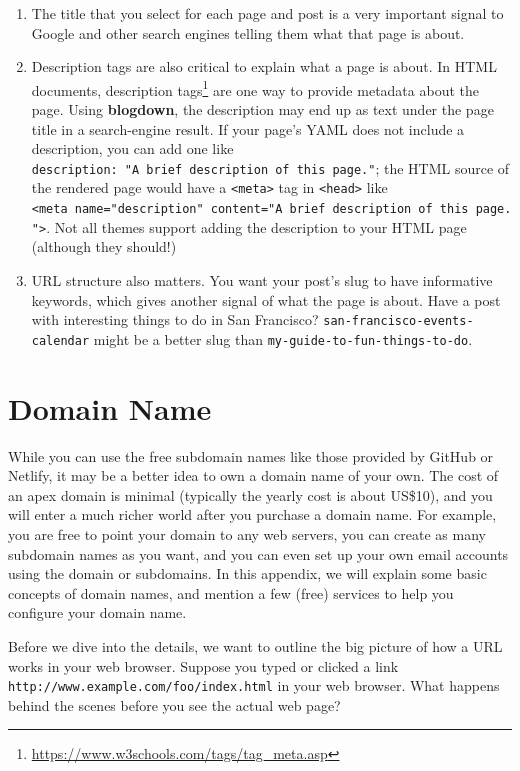 \documentclass[12pt,]{krantz}
\renewcommand{\href}[2]{#2\footnote{\url{#1}}}
\theoremstyle{definition}
\theoremstyle{definition}
\theoremstyle{definition}
\theoremstyle{remark}
\begin{document}
\begin{enumerate}
\def\labelenumi{\arabic{enumi}.}
\item
  The title that you select for each page and post is a very important
  signal to Google and other search engines telling them what that page
  is about.
\item
  Description tags are also critical to explain what a page is about. In
  HTML documents,
  \href{https://www.w3schools.com/tags/tag_meta.asp}{description tags}
  are one way to provide metadata about the page. Using
  \textbf{blogdown}, the description may end up as text under the page
  title in a search-engine result. If your page's YAML does not include
  a description, you can add one like
  \texttt{description:\ "A\ brief\ description\ of\ this\ page."}; the
  HTML source of the rendered page would have a
  \texttt{\textless{}meta\textgreater{}} tag in
  \texttt{\textless{}head\textgreater{}} like
  \texttt{\textless{}meta\ name="description"\ content="A\ brief\ description\ of\ this\ page."\textgreater{}}.
  Not all themes support adding the description to your HTML page
  (although they should!)
\item
  URL structure also matters. You want your post's slug to have
  informative keywords, which gives another signal of what the page is
  about. Have a post with interesting things to do in San Francisco?
  \texttt{san-francisco-events-calendar} might be a better slug than
  \texttt{my-guide-to-fun-things-to-do}.
\end{enumerate}

\chapter{Domain Name}\label{domain-name}

While you can use the free subdomain names like those
provided by GitHub or Netlify, it may be a better idea to own a domain
name of your own. The cost of an apex domain is minimal (typically the
yearly cost is about US\$10), and you will enter a much richer world
after you purchase a domain name. For example, you are free to point
your domain to any web servers, you can create as many subdomain names
as you want, and you can even set up your own email accounts using the
domain or subdomains. In this appendix, we will explain some basic
concepts of domain names, and mention a few (free) services to help you
configure your domain name.

Before we dive into the details, we want to outline the big picture of
how a URL works in your web browser. Suppose you typed or clicked a link
\texttt{http://www.example.com/foo/index.html} in your web browser. What
happens behind the scenes before you see the actual web page?
\end{document}
